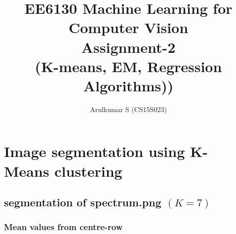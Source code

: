 \documentclass[fleqn]{article}
\title{EE6130 Machine Learning for Computer Vision\\ Assignment-2 \\(K-means, EM, Regression Algorithms))}
\author{Arulkumar S (CS15S023)}
\begin{document}
\setcounter{secnumdepth}{5}
\tracingall
\maketitle

\section{Image segmentation using K-Means clustering}

\subsection{segmentation of spectrum.png $(K=7)$}

\subsubsection{Mean values from centre-row}
\end{document}
